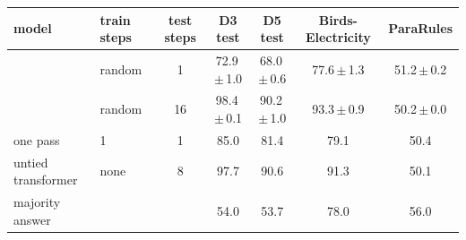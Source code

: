 \begin{tabular}{llccccc}
\toprule
model & train steps & test steps & D3 test & D5 test & Birds-Electricity & ParaRules \\
\midrule
\zr{} & random & 1 & 72.9\,$\pm$\,1.0 & 68.0\,$\pm$\,0.6 & 77.6\,$\pm$\,1.3 & 51.2\,$\pm$\,0.2 \\
\zr{} & random & 16 & 98.4\,$\pm$\,0.1 & 90.2\,$\pm$\,1.0 & 93.3\,$\pm$\,0.9 & 50.2\,$\pm$\,0.0 \\
one pass & 1 & 1 & 85.0 & 81.4 & 79.1 & 50.4 \\
untied transformer & none & 8 & 97.7 & 90.6 & 91.3 & 50.1 \\
\midrule
majority answer & & & 54.0 & 53.7 & 78.0 & 56.0 \\
\bottomrule
\end{tabular}
